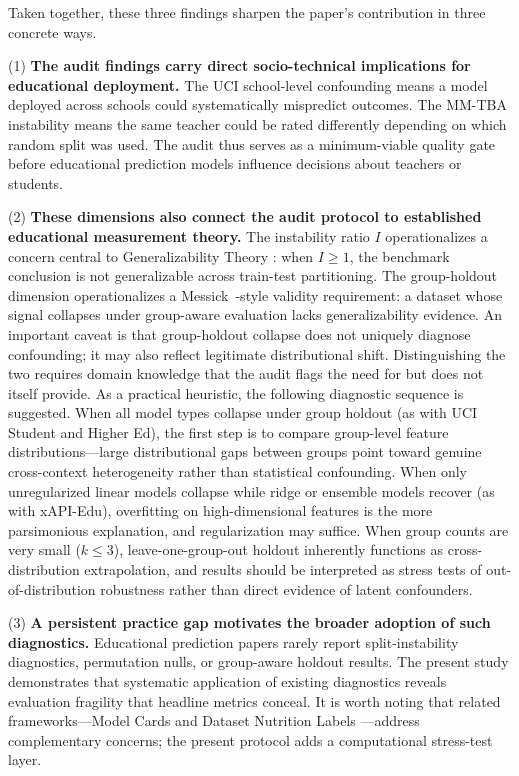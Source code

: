 Taken together, these three findings sharpen the paper's contribution in three concrete ways.

(1) \textbf{The audit findings carry direct socio-technical implications for educational deployment. } The UCI school-level confounding means a model deployed across schools could systematically mispredict outcomes. The MM-TBA instability means the same teacher could be rated differently depending on which random split was used. The audit thus serves as a minimum-viable quality gate before educational prediction models influence decisions about teachers or students.

(2) \textbf{These dimensions also connect the audit protocol to established educational measurement theory. } The instability ratio $I$ operationalizes a concern central to Generalizability Theory \citep{Brennan2001}: when $I \geq 1$, the benchmark conclusion is not generalizable across train-test partitioning. The group-holdout dimension operationalizes a Messick~\citep{Messick1995}-style validity requirement: a dataset whose signal collapses under group-aware evaluation lacks generalizability evidence. An important caveat is that group-holdout collapse does not uniquely diagnose confounding; it may also reflect legitimate distributional shift. Distinguishing the two requires domain knowledge that the audit flags the need for but does not itself provide. As a practical heuristic, the following diagnostic sequence is suggested. When all model types collapse under group holdout (as with UCI Student and Higher Ed), the first step is to compare group-level feature distributions---large distributional gaps between groups point toward genuine cross-context heterogeneity rather than statistical confounding. When only unregularized linear models collapse while ridge or ensemble models recover (as with xAPI-Edu), overfitting on high-dimensional features is the more parsimonious explanation, and regularization may suffice. When group counts are very small ($k \leq 3$), leave-one-group-out holdout inherently functions as cross-distribution extrapolation, and results should be interpreted as stress tests of out-of-distribution robustness rather than direct evidence of latent confounders.

(3) \textbf{A persistent practice gap motivates the broader adoption of such diagnostics.} Educational prediction papers rarely report split-instability diagnostics, permutation nulls, or group-aware holdout results. The present study demonstrates that systematic application of existing diagnostics reveals evaluation fragility that headline metrics conceal. It is worth noting that related frameworks---Model Cards \citep{Mitchell2019} and Dataset Nutrition Labels \citep{Holland2020}---address complementary concerns; the present protocol adds a computational stress-test layer.

